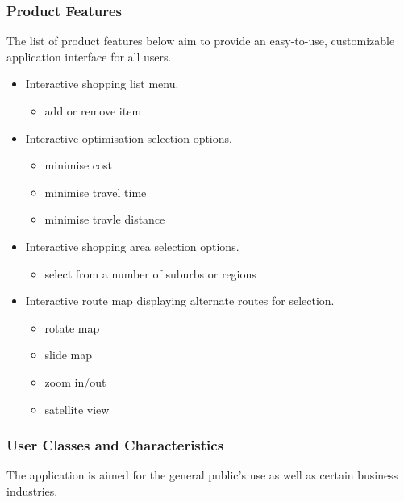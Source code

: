 \documentclass[10pt,twocolumn]{witseiepaper}
\begin{document}
		\subsubsection{Product Features}
		
			The list of product features below aim to provide an easy-to-use, customizable application interface for all users. 
		
			\begin{itemize}
				\item Interactive shopping list menu.
				\begin{itemize}
					\item add or remove item
				\end{itemize}
				\item Interactive optimisation selection options.
				\begin{itemize}
					\item minimise cost
					\item minimise travel time
					\item minimise travle distance
				\end{itemize}
				\item Interactive shopping area selection options.
				\begin{itemize}
					\item select from a number of suburbs or regions
				\end{itemize}
				\item Interactive route map displaying alternate routes for selection.
				\begin{itemize}
					\item rotate map
					\item slide map
					\item zoom in/out
					\item satellite view
				\end{itemize}
			\end{itemize}
		
		\subsubsection{User Classes and Characteristics}
		
			The application is aimed for the general public's use as well as certain business industries. 
		
\end{document}
